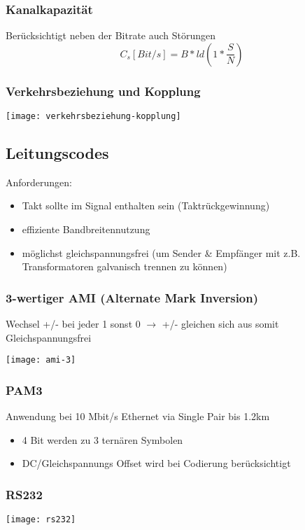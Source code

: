 \subsubsection{Kanalkapazität}
Berücksichtigt neben der Bitrate auch Störungen
$$C_s [Bit/s] = B * ld(1 * \frac{S}{N})$$

\subsubsection{Verkehrsbeziehung und Kopplung}
\begin{center}
	\texttt{[image: verkehrsbeziehung-kopplung]}
\end{center}

\subsection{Leitungscodes}
Anforderungen:
\begin{itemize}
	\item Takt sollte im Signal enthalten sein (Taktrückgewinnung)
	\item effiziente Bandbreitennutzung
	\item möglichst gleichspannungsfrei (um Sender \& Empfänger mit z.B.
	      Transformatoren galvanisch trennen zu können)
\end{itemize}


\subsubsection{3-wertiger AMI (Alternate Mark Inversion)}
Wechsel +/- bei jeder 1 sonst 0 $\rightarrow$ +/- gleichen sich aus
somit Gleichspannungsfrei
\begin{center}
	\texttt{[image: ami-3]}
\end{center}

\subsubsection{PAM3}
Anwendung bei 10 Mbit/s Ethernet via Single Pair bis 1.2km
\begin{itemize}
	\item 4 Bit werden zu 3 ternären Symbolen
	\item DC/Gleichspannungs Offset wird bei Codierung berücksichtigt
\end{itemize}

\subsubsection{RS232}
\begin{center}
	\texttt{[image: rs232]}
\end{center}





